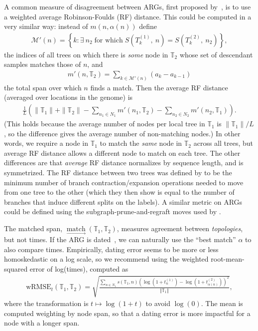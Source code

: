 \documentclass[10pt,twoside,lineno]{gsajnl}
\newcommand{\T}{\mathbb{T}}
\newcommand{\match}{\underset{\longrightarrow}{\operatorname{match}}}
\begin{document}
A common measure of disagreement between ARGs, 
first proposed by~\cite{kuhner2015assessing}, 
is to use a weighted average Robinson-Foulds (RF) distance.
This could be computed in a very similar way:
instead of $m(n, \alpha(n))$ define
\begin{align*}
    \mathcal{M}'(n) = \left\{ k : \exists\ n_2  \;\text{for which}\; S\left(T^{(1)}_k,\ n\right) = S\left(T^{(2)}_k,\ n_2\right) \right\},
\end{align*}
the indices of all trees on which there is \emph{some} node in $\T_2$
whose set of descendant samples matches those of $n$, and
\begin{align*}
    m'(n, \T_2) = \sum_{k \in \mathcal{M}'(n)} (a_k - a_{k-1})
\end{align*}
the total span over which $n$ finds a match.
Then the average RF distance (averaged over locations in the genome) 
is
\begin{align*}
    \frac{1}{L} \left( \|\T_1\| + \|\T_2\|
        - \sum_{n_1 \in N_1} m'(n_1, \T_2) - \sum_{n_2 \in N_2} m'(n_2, \T_1) \right).
\end{align*}
(This holds because the average number of nodes per local tree in $\T_1$ is $\|\T_1\|/L$,
so the difference gives the average number of non-matching nodes.)
In other words, we require a node in $\T_1$ to match the \emph{same} node in $\T_2$
across all trees, but average RF distance allows a different node to match
on each tree.
The other differences are that \emph{average} RF distance
normalizes by sequence length, and is symmetrized.
The RF distance between two trees
was defined by \citet{robinson1981comparison}
to be the minimum number of branch contraction/expansion operations needed to move
from one tree to the other
(which they then show is equal to the number of branches 
that induce different splits on the labels).
A similar metric on ARGs could be defined
using the subgraph-prune-and-regraft moves used by \citet{deng2024robust}.

The matched span, $\match(\T_1, \T_2)$, measures agreement between \emph{topologies},
but not times.
If the ARG is dated~\citep[e.g., as in][]{wohns2022unified,deng2024robust}, 
we can naturally use the ``best match'' $\alpha$
to also compare times.
Empirically, dating error seems to be more or less homoskedastic on a log scale,
so we recommend 
using the weighted root-mean-squared error of log(times), computed as
\begin{align}\label{eqn:wrmse}
    \text{wRMSE}_t(\T_1, \T_2)
    = \sqrt{\frac{
        \sum_{n \in N_1} s(\T_1,n) \left(\log\left(1+ t^{(1)}_n\right) - \log\left(1+ t^{(2)}_{\alpha(n)}\right) \right)^2 
    }{
        \Vert{\T_1}\Vert
    } } ,
\end{align}
where the transformation is $t \mapsto \log(1 + t)$ to avoid $\log(0)$.
The mean is computed weighting by node span, so that a dating error
is more impactful for a node with a longer span. 
\end{document}
